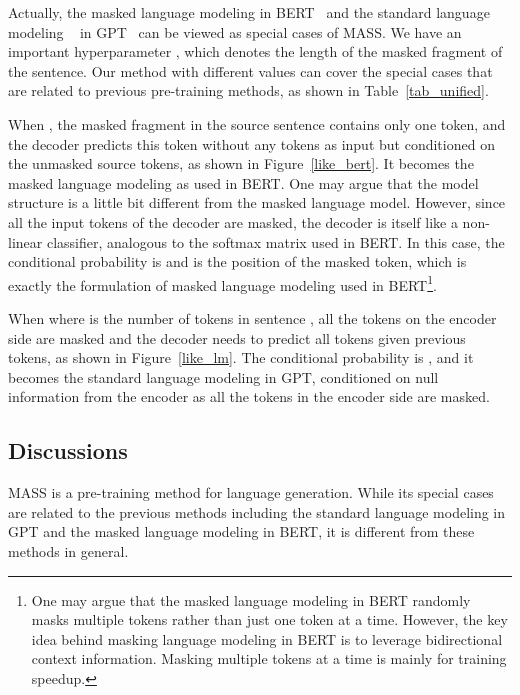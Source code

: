 \documentclass{article}
\begin{document}
	Actually, the masked language modeling in BERT~\citep{devlin2018bert} and the standard language modeling
	~\citep{bengio2003neural,mikolov2010recurrent} in GPT~\citep{radford2018improving} can be viewed as special cases of MASS. We have an important hyperparameter , which denotes the length of the masked fragment of the sentence. Our method with different  values can cover the special cases that are related to previous pre-training methods, as shown in Table~\ref{tab_unified}.
	
	When , the masked fragment in the source sentence contains only one token, and the decoder predicts this token without any tokens as input but conditioned on the unmasked source tokens, as shown in Figure~\ref{like_bert}. It becomes the masked language modeling as used in BERT. One may argue that the model structure is a little bit different from the masked language model. However, since all the input tokens of the decoder are masked, the decoder is itself like a non-linear classifier, analogous to the softmax matrix used in BERT. In this case, the conditional probability is  and  is the position of the masked token, which is exactly the formulation of masked language modeling used in BERT\footnote{One may argue that the masked language modeling in BERT randomly masks multiple tokens rather than just one token at a time. However, the key idea behind masking language modeling in BERT is to leverage bidirectional context information. Masking multiple tokens at a time is mainly for training speedup.}.
	
	When  where  is the number of tokens in sentence , all the tokens on the encoder side are masked and the decoder needs to predict all tokens given previous tokens, as shown in Figure~\ref{like_lm}. The conditional probability is , and it becomes the standard language modeling in GPT, conditioned on null information from the encoder as all the tokens in the encoder side are masked. 
	
	\subsection{Discussions}
	\label{sec_mass_compare}
	MASS is a pre-training method for language generation. While its special cases are related to the previous methods including the standard language modeling in GPT and the masked language modeling in BERT, it is different from these methods in general.
	
\end{document}
